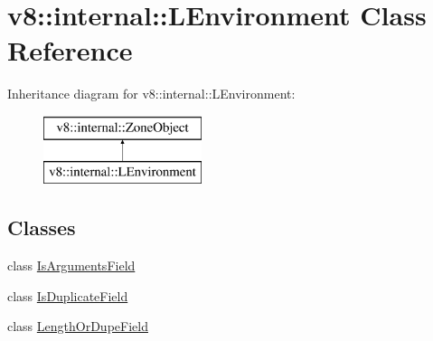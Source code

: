 \hypertarget{classv8_1_1internal_1_1_l_environment}{}\section{v8\+:\+:internal\+:\+:L\+Environment Class Reference}
\label{classv8_1_1internal_1_1_l_environment}
Inheritance diagram for v8\+:\+:internal\+:\+:L\+Environment\+:\begin{figure}[H]
\begin{center}
\leavevmode
\includegraphics[height=2.000000cm]{classv8_1_1internal_1_1_l_environment}
\end{center}
\end{figure}
\subsection*{Classes}
\begin{DoxyCompactItemize}
\item 
class \hyperlink{classv8_1_1internal_1_1_l_environment_1_1_is_arguments_field}{Is\+Arguments\+Field}
\item 
class \hyperlink{classv8_1_1internal_1_1_l_environment_1_1_is_duplicate_field}{Is\+Duplicate\+Field}
\item 
class \hyperlink{classv8_1_1internal_1_1_l_environment_1_1_length_or_dupe_field}{Length\+Or\+Dupe\+Field}
\end{DoxyCompactItemize}
